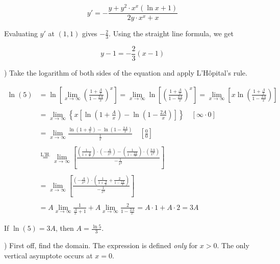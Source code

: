 \documentclass{article}
\begin{document}
\[y'=-\frac{y+y^2\cdot x^x(\ln x+1)}{2y\cdot x^x+x}\]

\hfill

\noindent Evaluating $y'$ at $(1,1)$ gives $\displaystyle-\frac23$. Using the straight line formula, we get

\begin{equation*}
\boxed{y-1 =-\frac23(x-1)}
\end{equation*}

\newpage

) Take the logarithm of both sides of the equation and apply L'Hôpital's rule.

\begin{align*}
\ln(5)&=\ln\left[\lim_{x\to\infty}\left(\frac{\displaystyle1+\frac Ax}{\displaystyle1-\frac {2A}x}\right)^{x}\right]=\lim_{x\to\infty}\ln\left[\left(\frac{\displaystyle1+\frac Ax}{\displaystyle1-\frac {2A}x}\right)^{x}\right]=\lim_{x\to\infty}\left[x\ln\left(\frac{\displaystyle1+\frac Ax}{\displaystyle1-\frac {2A}x}\right)\right]\\\\&=\lim_{x\to\infty}\left\{x\left[\ln\left(1+\frac Ax\right)-\ln\left(1-\frac {2A}x\right)\right]\right\}\quad\left[\infty\cdot0\right]\\\\&=\lim_{x\to\infty}\frac{\displaystyle\ln\left(1+\frac Ax\right)-\ln\left(1-\frac {2A}x\right)}{\displaystyle\frac1x}\quad\left[\frac00\right]\\\\&\overset{\text{L'H.}}{=}\lim_{x\to\infty}\left[\frac{\displaystyle\left(\frac1{1+\frac Ax}\right)\cdot\left(-\frac{A}{x^2}\right)-\left(\frac1{1-\frac{2A}x}\right)\cdot\left(\frac{2A}{x^2}\right)}{\displaystyle -\frac1{x^2}}\right]\\\\&=\lim_{x\to\infty}\left[\frac{\displaystyle\left(-\frac{A}{x^2}\right)\cdot\left(\frac1{1+\frac{A}x}+\frac{2}{1-\frac{2A}x}\right)}{\displaystyle-\frac{1}{x^2}}\right]\\\\&=A\lim_{x\to\infty}\frac1{\frac Ax + 1}+A\lim_{x\to\infty}\frac2{1-\frac{2A}x} = A \cdot 1 + A \cdot 2 = 3A
\end{align*}

\hfill

\noindent If $\ln(5) = 3A$, then $\boxed{A =\frac{\ln5}3}$.

\hfill

) First off, find the domain. The expression is defined \textit{only} for $x>0$. The only vertical asymptote occurs at $x=0$.
\end{document}
